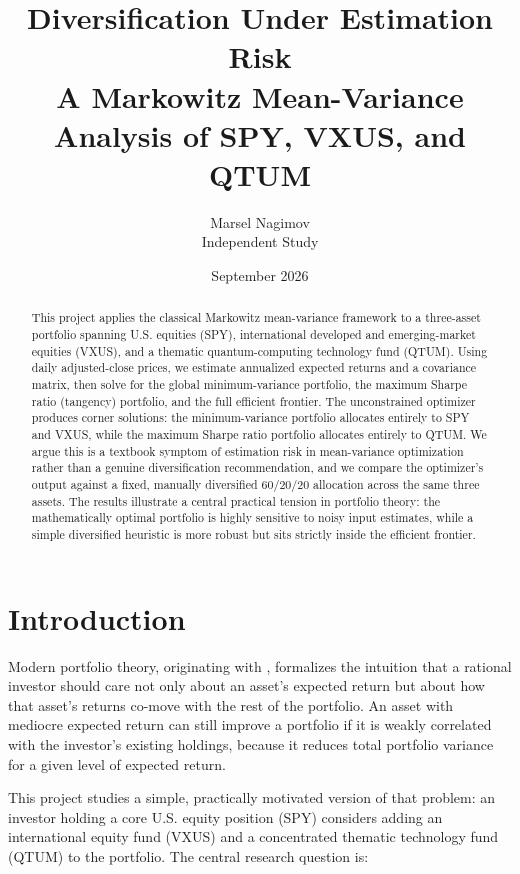 \documentclass[11pt]{article}
\title{\textbf{Diversification Under Estimation Risk}\\[4pt]
\large A Markowitz Mean-Variance Analysis of SPY, VXUS, and QTUM}
\author{Marsel Nagimov \\ Independent Study}
\date{September 2026}
\begin{document}
\maketitle
\thispagestyle{plain}

\begin{abstract}
This project applies the classical Markowitz mean-variance framework to a
three-asset portfolio spanning U.S. equities (SPY), international developed
and emerging-market equities (VXUS), and a thematic quantum-computing
technology fund (QTUM). Using daily adjusted-close prices, we estimate
annualized expected returns and a covariance matrix, then solve for the
global minimum-variance portfolio, the maximum Sharpe ratio (tangency)
portfolio, and the full efficient frontier. The unconstrained optimizer
produces corner solutions: the minimum-variance portfolio allocates entirely
to SPY and VXUS, while the maximum Sharpe ratio portfolio allocates entirely
to QTUM. We argue this is a textbook symptom of estimation risk in
mean-variance optimization rather than a genuine diversification
recommendation, and we compare the optimizer's output against a fixed,
manually diversified 60/20/20 allocation across the same three assets. The
results illustrate a central practical tension in portfolio theory: the
mathematically optimal portfolio is highly sensitive to noisy input
estimates, while a simple diversified heuristic is more robust but
sits strictly inside the efficient frontier.
\end{abstract}

\section{Introduction}

Modern portfolio theory, originating with \citet*{markowitz1952}, formalizes
the intuition that a rational investor should care not only about an
asset's expected return but about how that asset's returns co-move with the
rest of the portfolio. An asset with mediocre expected return can still
improve a portfolio if it is weakly correlated with the investor's existing
holdings, because it reduces total portfolio variance for a given level of
expected return.

This project studies a simple, practically motivated version of that
problem: an investor holding a core U.S. equity position (SPY) considers
adding an international equity fund (VXUS) and a concentrated thematic
technology fund (QTUM) to the portfolio. The central research question is:
\end{document}
